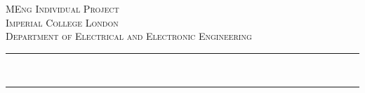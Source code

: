 \begin{titlepage}

    \newcommand{\HRule}{\rule{\linewidth}{0.5mm}} %




    \center %


    \textsc{\LARGE MEng Individual Project}\\[1.5cm] %
    \textsc{\Large Imperial College London}\\[0.5cm] %
    \textsc{\large Department of Electrical and Electronic Engineering}\\[0.5cm] %

    \makeatletter

    \HRule \\[0.4cm]
    { \huge \bfseries \@title \par}  %
    \vspace{0.4cm} 
    \HRule \\[1.5cm]



\end{titlepage}
